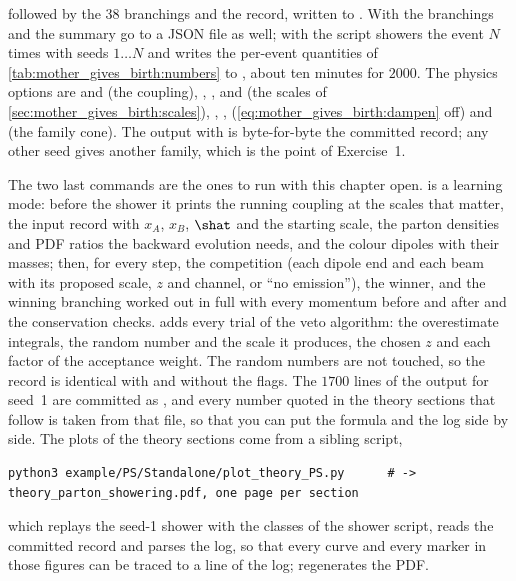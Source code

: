 followed by the 38 branchings and the record, written to
. With  the branchings and the
summary go to a JSON file as well; with  the script showers
the event $N$ times with seeds $1\ldots N$ and writes the per-event
quantities of \cref{tab:mother_gives_birth:numbers} to
, about ten minutes for $2000$. The physics options are
 and  (the coupling), ,
,  and  (the scales of
\cref{sec:mother_gives_birth:scales}), , ,
 (\cref{eq:mother_gives_birth:dampen} off) and
 (the family cone). The output with  is
byte-for-byte the committed record; any other seed gives another family,
which is the point of Exercise~1.

The two last commands are the ones to run with this chapter open.
 is a learning mode: before the shower it prints the running
coupling at the scales that matter, the input record with $x_A$, $x_B$,
$\shat$ and the starting scale, the parton densities and PDF ratios the
backward evolution needs, and the colour dipoles with their masses; then,
for every step, the competition (each dipole end and each beam with its
proposed scale, $z$ and channel, or ``no emission''), the winner, and the
winning branching worked out in full with every momentum before and after
and the conservation checks.  adds every trial of the veto
algorithm: the overestimate integrals, the random number and the scale it
produces, the chosen $z$ and each factor of the acceptance weight. The
random numbers are not touched, so the record is identical with and
without the flags. The $1700$ lines of the  output for seed~1 are
committed as ,
and every number quoted in the theory sections that follow is taken from
that file, so that you can put the formula and the log side by side.
The plots of the theory sections come from a sibling script,
\begin{verbatim}
python3 example/PS/Standalone/plot_theory_PS.py      # -> theory_parton_showering.pdf, one page per section
\end{verbatim}
which replays the seed-1 shower with the classes of the shower script,
reads the committed record and parses the  log, so that every
curve and every marker in those figures can be traced to a line of the
log;  regenerates the PDF.


